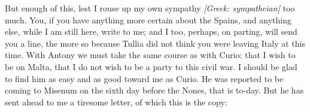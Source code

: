  But enough of this, lest I rouse up my own sympathy \textit{[Greek: sympatheian]} too much. You, if you have anything more certain about the Spains, and anything else, while I am still here, write to me; and I too, perhaps, on parting, will send you a line, the more so because Tullia did not think you were leaving Italy at this time. With Antony we must take the same course as with Curio: that I wish to be on Malta, that I do not wish to be a party to this civil war. I should be glad to find him as easy and as good toward me as Curio. He was reported to be coming to Misenum on the sixth day before the Nones, that is to-day. But he has sent ahead to me a tiresome letter, of which this is the copy:
